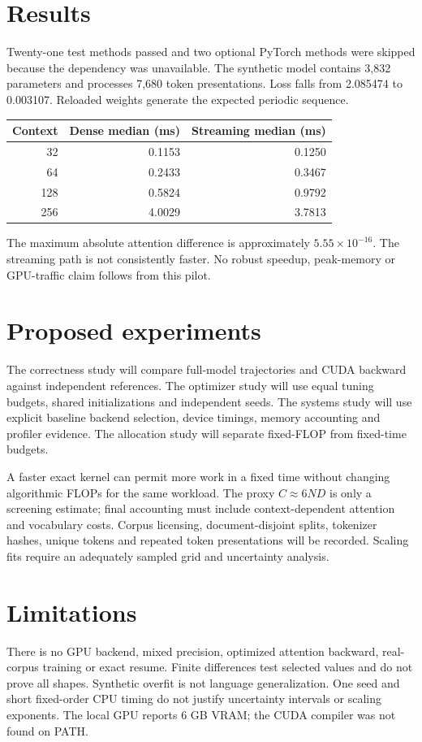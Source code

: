 \documentclass[11pt]{article}
\begin{document}
\section{Results}
Twenty-one test methods passed and two optional PyTorch methods were skipped because the dependency was unavailable. The synthetic model contains 3,832 parameters and processes 7,680 token presentations. Loss falls from 2.085474 to 0.003107. Reloaded weights generate the expected periodic sequence.
\begin{center}
\begin{tabular}{rrr}\toprule
Context & Dense median (ms) & Streaming median (ms)\\\midrule
32 & 0.1153 & 0.1250\\
64 & 0.2433 & 0.3467\\
128 & 0.5824 & 0.9792\\
256 & 4.0029 & 3.7813\\\bottomrule
\end{tabular}
\end{center}
The maximum absolute attention difference is approximately $5.55\times10^{-16}$. The streaming path is not consistently faster. No robust speedup, peak-memory or GPU-traffic claim follows from this pilot.
\section{Proposed experiments}
The correctness study will compare full-model trajectories and CUDA backward against independent references. The optimizer study will use equal tuning budgets, shared initializations and independent seeds. The systems study will use explicit baseline backend selection, device timings, memory accounting and profiler evidence. The allocation study will separate fixed-FLOP from fixed-time budgets.

A faster exact kernel can permit more work in a fixed time without changing algorithmic FLOPs for the same workload. The proxy $C\approx6ND$ is only a screening estimate; final accounting must include context-dependent attention and vocabulary costs. Corpus licensing, document-disjoint splits, tokenizer hashes, unique tokens and repeated token presentations will be recorded. Scaling fits require an adequately sampled grid and uncertainty analysis.
\section{Limitations}
There is no GPU backend, mixed precision, optimized attention backward, real-corpus training or exact resume. Finite differences test selected values and do not prove all shapes. Synthetic overfit is not language generalization. One seed and short fixed-order CPU timing do not justify uncertainty intervals or scaling exponents. The local GPU reports 6 GB VRAM; the CUDA compiler was not found on PATH.
\end{document}
